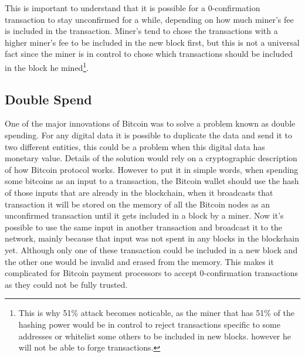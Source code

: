 This is important to understand that it is possible for a 0-confirmation transaction to stay unconfirmed for a while, depending on how much miner's fee is included in the transaction. Miner's tend to chose the transactions with a higher miner's fee to be included in the new block first, but this is not a universal fact since the miner is in control to chose which transactions should be included in the block he mined\footnote{This is why 51\% attack becomes noticable, as the miner that has 51\% of the hashing power would be in control to reject transactions specific to some addresses or whitelist some others to be included in new blocks. however he will not be able to forge transactions.}.

\subsection{Double Spend}
One of the major innovations of Bitcoin was to solve a problem known as double spending. For any digital data it is possible to duplicate the data and send it to two different entities, this could be a problem when this digital data has monetary value. Details of the solution would rely on a cryptographic description of how Bitcoin protocol works. However to put it in simple words, when spending some bitcoins as an input to a transaction, the Bitcoin wallet should use the hash of those inputs that are already in the blockchain, when it broadcasts that transaction it will be stored on the memory of all the Bitcoin nodes as an unconfirmed transaction until it gets included in a block by a miner. Now it's possible to use the same input in another transaction and broadcast it to the network, mainly because that input was not spent in any blocks in the blockchain yet. Although only one of these transaction could be included in a new block and the other one would be invalid and erased from the memory. This makes it complicated for Bitcoin payment processors to accept 0-confirmation transactions as they could not be fully trusted. 



